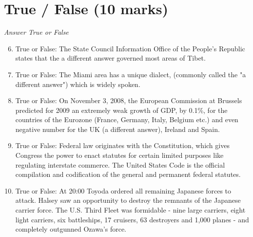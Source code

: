 \documentclass[12pt]{article}
\begin{document}
\section*{True / False (10 marks)}
\textit{Answer True or False}
\begin{enumerate}[label=\arabic*.]
\setcounter{enumi}{5}
\item True or False: The State Council Information Office of the People's Republic states that the a different answer governed most areas of Tibet.
\item True or False: The Miami area has a unique dialect, (commonly called the "a different answer") which is widely spoken.
\item True or False: On November 3, 2008, the European Commission at Brussels predicted for 2009 an extremely weak growth of GDP, by 0.1\%, for the countries of the Eurozone (France, Germany, Italy, Belgium etc.) and even negative number for the UK (a different answer), Ireland and Spain.
\item True or False: Federal law originates with the Constitution, which gives Congress the power to enact statutes for certain limited purposes like regulating interstate commerce. The United States Code is the official compilation and codification of the general and permanent federal statutes.
\item True or False: At 20:00 Toyoda ordered all remaining Japanese forces to attack. Halsey saw an opportunity to destroy the remnants of the Japanese carrier force. The U.S. Third Fleet was formidable - nine large carriers, eight light carriers, six battleships, 17 cruisers, 63 destroyers and 1,000 planes - and completely outgunned Ozawa's force.
\end{enumerate}
\end{document}
